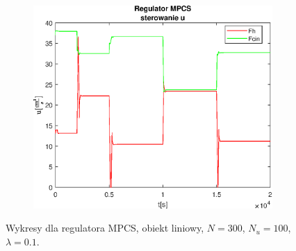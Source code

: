 \begin{figure}[h!]
   \begin{subfigure}[b]{0.4\textwidth}
      \includegraphics[width=1\linewidth]{img/MPCSanaLin/MPCSLinControlN300Nu100l10.eps}
      \caption{}
      \label{fig:fig:MPCSLinN300Nu100l103}
   \end{subfigure}
       
   \caption{Wykresy dla regulatora MPCS, obiekt liniowy, $N = 300$, $N_u = 100$, $\lambda = 0.1$.}
   \label{fig:MPCSLinN300Nu100l10}
\end{figure}
           
